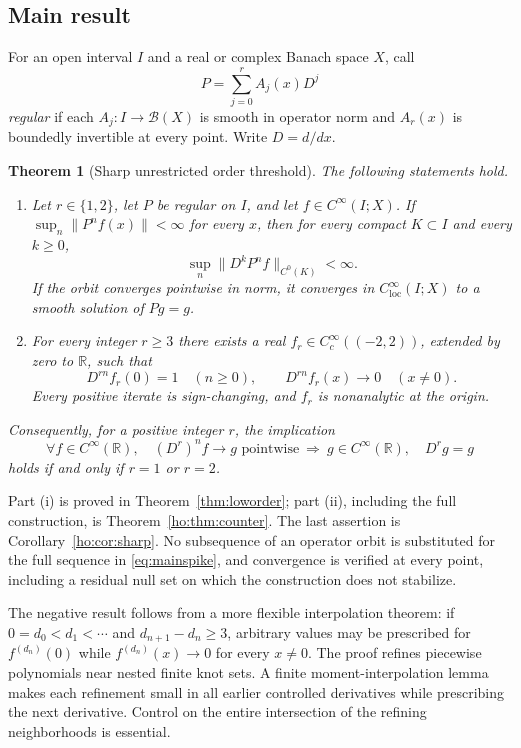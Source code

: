 \documentclass[11pt,reqno]{amsart}
\numberwithin{equation}{section}
\newtheorem{theorem}{Theorem}[section]
\theoremstyle{definition}
\theoremstyle{remark}
\newcommand{\R}{\mathbb R}
\newcommand{\loc}{\mathrm{loc}}
\begin{document}
\subsection{Main result}
For an open interval $I$ and a real or complex Banach space $X$, call
\[
 P=\sum_{j=0}^r A_j(x)D^j
\]
\emph{regular} if each $A_j:I\to\mathcal B(X)$ is smooth in operator norm and $A_r(x)$ is boundedly invertible at every point. Write $D=d/dx$.

\begin{theorem}[Sharp unrestricted order threshold]\label{thm:mainthreshold}
The following statements hold.
\begin{enumerate}[label=\textup{(\roman*)},leftmargin=2.3em]
\item Let $r\in\{1,2\}$, let $P$ be regular on $I$, and let $f\in C^\infty(I;X)$. If $\sup_n\|P^nf(x)\|<\infty$ for every $x$, then for every compact $K\subset I$ and every $k\ge0$,
\[
 \sup_n\|D^kP^nf\|_{C^0(K)}<\infty.
\]
If the orbit converges pointwise in norm, it converges in $C^\infty_{\loc}(I;X)$ to a smooth solution of $Pg=g$.
\item For every integer $r\ge3$ there exists a real $f_r\in C_c^\infty((-2,2))$, extended by zero to $\R$, such that
\begin{equation}\label{eq:mainspike}
 D^{rn}f_r(0)=1\quad(n\ge0),\qquad
 D^{rn}f_r(x)\longrightarrow0\quad(x\ne0).
\end{equation}
Every positive iterate is sign-changing, and $f_r$ is nonanalytic at the origin.
\end{enumerate}
Consequently, for a positive integer $r$, the implication
\[
 \forall f\in C^\infty(\R),\quad
 (D^r)^nf\to g\text{ pointwise}
 \ \Longrightarrow\ g\in C^\infty(\R),\quad D^rg=g
\]
holds if and only if $r=1$ or $r=2$.
\end{theorem}
Part (i) is proved in Theorem~\ref{thm:loworder}; part (ii), including the full construction, is Theorem~\ref{ho:thm:counter}. The last assertion is Corollary~\ref{ho:cor:sharp}. No subsequence of an operator orbit is substituted for the full sequence in \eqref{eq:mainspike}, and convergence is verified at every point, including a residual null set on which the construction does not stabilize.

The negative result follows from a more flexible interpolation theorem: if $0=d_0<d_1<\cdots$ and $d_{n+1}-d_n\ge3$, arbitrary values may be prescribed for $f^{(d_n)}(0)$ while $f^{(d_n)}(x)\to0$ for every $x\ne0$. The proof refines piecewise polynomials near nested finite knot sets. A finite moment-interpolation lemma makes each refinement small in all earlier controlled derivatives while prescribing the next derivative. Control on the entire intersection of the refining neighborhoods is essential.
\end{document}
